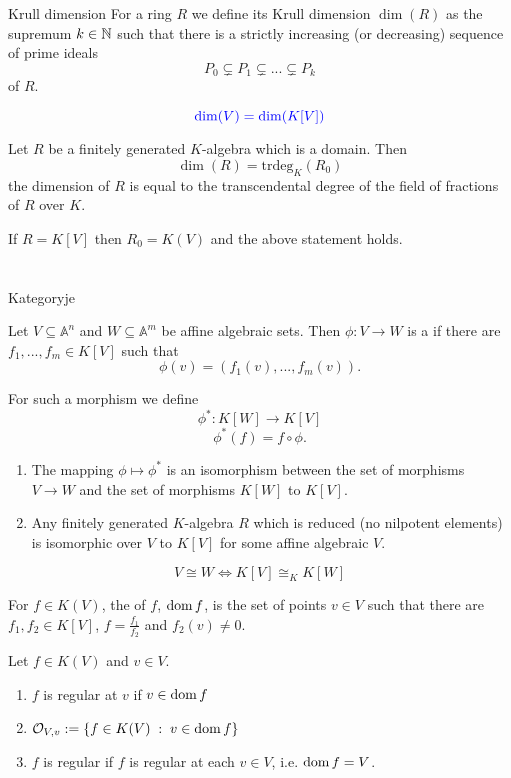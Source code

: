\documentclass[twoside, a4paper, 12pt]{book}
\begin{document}
\begin{definition}{Krull dimension}{}
  For a ring $R$ we define its Krull dimension $\dim(R)$ as the supremum $k\in\mathbb{N}$ such that there is a strictly increasing (or decreasing) sequence of prime ideals
  $$P_0\subsetneq P_1\subsetneq ...\subsetneq P_k$$
  of $R$.
\end{definition}
{\large\boldmath$$\color{blue}\dim(V)=\dim(K[V])$$}

\begin{theorem}{}{}
  Let $R$ be a finitely generated $K$-algebra which is a domain. Then
  $$\dim(R)=\text{trdeg}_K(R_0)$$
  the dimension of $R$ is equal to the transcendental degree of the field of fractions of $R$ over $K$.
\end{theorem}

If $R=K[V]$ then $R_0=K(V)$ and the above statement holds.

\section{}{Kategoryje}

Let $V\subseteq \mathbb{A}^n$ and $W\subseteq \mathbb{A}^m$ be affine algebraic sets. Then $\phi:V\to W$ is a  if there are $f_1,...,f_m\in K[V]$ such that
$$\phi(v)=(f_1(v),...,f_m(v)).$$

For such a morphism we define
$$\phi^*:K[W]\to K[V]$$
$$\phi^*(f)=f\circ \phi.$$
\begin{enumerate}
  \item The mapping $\phi\mapsto \phi^*$ is an isomorphism between the set of morphisms $V\to W$ and the set of morphisms $K[W]$ to $K[V]$.
  \item Any finitely generated $K$-algebra $R$ which is reduced (no nilpotent elements) is isomorphic over $V$ to $K[V]$ for some affine algebraic $V$.
\end{enumerate}

{\color{blue}\large\boldmath
$$V\cong W\iff K[V]\cong_K K[W]$$
}

For $f\in K(V)$, the  of $f$, $\operatorname{dom} f$, is the set of points $v\in V$ such that there are $f_1, f_2\in K[V]$, $f=\frac{f_1}{f_2}$ and $f_2(v)\neq0$.

\begin{definition}{}{}
  Let $f\in K(V)$ and $v\in V$.
  \begin{enumerate}
    \item $f$ is regular at $v$ if $v\in \operatorname{dom} f$
    \item $\mathcal{O}_{V,v}:=\{f\in K(V)\;:\;v\in \operatorname{dom} f\}$
    \item $f$ is regular if $f$ is regular at each $v\in V$, i.e. $\operatorname{dom} f=V$.
  \end{enumerate}
\end{definition}
\end{document}
